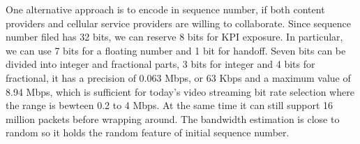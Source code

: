 One alternative approach is to encode in sequence number, if both content providers and cellular service providers are willing to collaborate. Since sequence number filed has 32 bits, we can reserve 8 bits for KPI exposure. In particular, we can use 7 bits for a floating number and 1 bit for handoff. Seven bits can be divided into integer and fractional parts, 3 bits for integer and 4 bits for fractional, it has a precision of 0.063 Mbps, or 63 Kbps and a maximum value of 8.94 Mbps, which is sufficient for today's video streaming bit rate selection where the range is bewteen 0.2 to 4 Mbps.
At the same time it can still support 16 million packets before wrapping around. The bandwidth estimation is close to random so it holds the random feature of initial sequence number.



